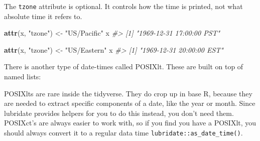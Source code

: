 \documentclass[]{book}
\newenvironment{Shaded}{\begin{snugshade}}{\end{snugshade}}
\newcommand{\KeywordTok}[1]{\textcolor[rgb]{0.13,0.29,0.53}{\textbf{{#1}}}}
\newcommand{\StringTok}[1]{\textcolor[rgb]{0.31,0.60,0.02}{{#1}}}
\newcommand{\CommentTok}[1]{\textcolor[rgb]{0.56,0.35,0.01}{\textit{{#1}}}}
\newcommand{\NormalTok}[1]{{#1}}
\begin{document}
\begin{Shaded}
\end{Shaded}

The \texttt{tzone} attribute is optional. It controls how the time is
printed, not what absolute time it refers to.

\begin{Shaded}
\begin{Highlighting}[]
\KeywordTok{attr}\NormalTok{(x, }\StringTok{"tzone"}\NormalTok{) <-}\StringTok{ "US/Pacific"}
\NormalTok{x}
\CommentTok{#> [1] "1969-12-31 17:00:00 PST"}

\KeywordTok{attr}\NormalTok{(x, }\StringTok{"tzone"}\NormalTok{) <-}\StringTok{ "US/Eastern"}
\NormalTok{x}
\CommentTok{#> [1] "1969-12-31 20:00:00 EST"}
\end{Highlighting}
\end{Shaded}

There is another type of date-times called POSIXlt. These are built on
top of named lists:

\begin{Shaded}
\end{Shaded}

POSIXlts are rare inside the tidyverse. They do crop up in base R,
because they are needed to extract specific components of a date, like
the year or month. Since lubridate provides helpers for you to do this
instead, you don't need them. POSIXct's are always easier to work with,
so if you find you have a POSIXlt, you should always convert it to a
regular data time \texttt{lubridate::as\_date\_time()}.
\end{document}
